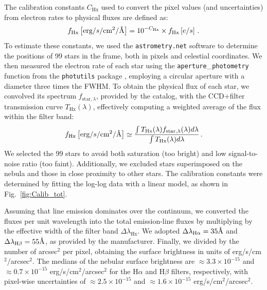 \documentclass[fleqn,usenatbib]{mnras}
\begin{document}
The calibration constants $C_\text{Hx}$ used to convert the pixel values (and uncertainties) from electron rates to physical fluxes are defined as:
\begin{equation}
  f_\text{Hx}\left[\text{erg}/s/\text{cm}^2/\text{\r{A}}\right] = 10^{-C_\text{Hx}} \times f_\text{Hx}\left[e/s\right] \, .
  \label{eq:calibration}
\end{equation}
To estimate these constants, we used the \texttt{astrometry.net} software \citep{Astrometry_2010} to determine the positions of 99 stars in the frame, both in pixels and celestial coordinates.
We then measured the electron rate of each star using the \texttt{aperture}\_\texttt{photometry} function from the \texttt{photutils} package \citep{Bradley_2024}, employing a circular aperture with a diameter three times the FWHM.
To obtain the physical flux of each star, we convolved its spectrum $f_{\text{star}, \lambda}$, provided by the \cite{Gaia_2023} catalog, with the CCD+filter transmission curve $T_\text{Hx}(\lambda)$, effectively computing a weighted average of the flux within the filter band:
\begin{equation}
  f_\text{Hx}\left[\text{erg}/s/\text{cm}^2/\text{\r{A}}\right] \simeq 
  \frac{\int T_\text{Hx}(\lambda) f_{\text{star}, \lambda}(\lambda) d\lambda}{\int T_\text{Hx}(\lambda) d\lambda} \, .
  \label{eq:flux_convolution}
\end{equation}
We selected the 99 stars to avoid both saturation (too bright) and low signal-to-noise ratio (too faint). 
Additionally, we excluded stars superimposed on the nebula and those in close proximity to other stars.
The calibration constants were determined by fitting the log-log data with a linear model, as shown in Fig.~\ref{fig:Calib_tot}. 

Assuming that line emission dominates over the continuum, we converted the fluxes per unit wavelength into the total emission-line fluxes by multiplying by the effective width of the filter band $\Delta \lambda_\text{Hx}$.
We adopted $\Delta \lambda_{\text{H}\alpha} = 35 \text{\r{A}}$ and $\Delta \lambda_{\text{H}\beta} = 55 \text{\r{A}}$, as provided by the manufacturer. 
Finally, we divided by the number of arcsec$^2$ per pixel, obtaining the surface brightness in units of erg/s/cm$^2$/arcsec$^2$.
The medians of the nebular surface brightness are $\approx 3.3 \times 10^{-15}$ and $\approx 0.7 \times 10^{-15}$ erg/s/cm$^2$/arcsec$^2$ for the H$\alpha$ and H$\beta$ filters, respectively, with pixel-wise uncertainties of $\approx 2.5 \times 10^{-15}$ and $\approx 1.6 \times 10^{-15}$ erg/s/cm$^2$/arcsec$^2$.
\end{document}
